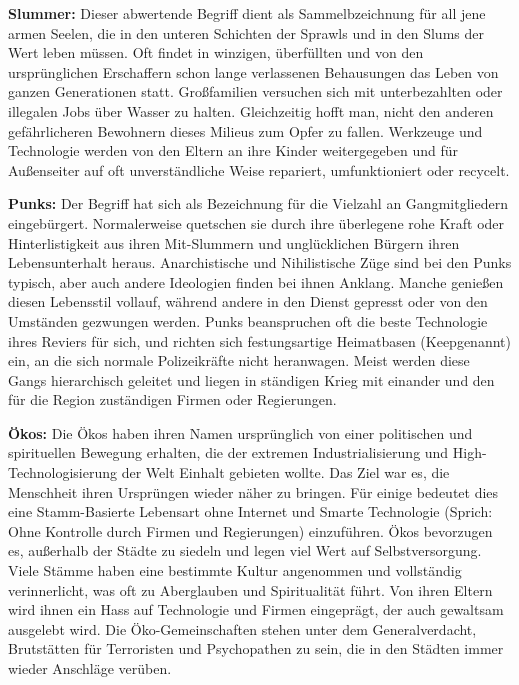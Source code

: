 \textbf{Slummer:} Dieser abwertende Begriff dient als Sammelbzeichnung für all jene armen Seelen, die in den unteren Schichten der Sprawls und in den Slums der Wert leben müssen. Oft findet in winzigen, überfüllten und von den ursprünglichen Erschaffern schon lange verlassenen Behausungen das Leben von ganzen Generationen statt. Großfamilien versuchen sich mit unterbezahlten oder illegalen Jobs über Wasser zu halten. Gleichzeitig hofft man, nicht den anderen gefährlicheren Bewohnern dieses Milieus zum Opfer zu fallen. Werkzeuge und Technologie werden von den Eltern an ihre Kinder weitergegeben und für Außenseiter auf oft unverständliche Weise repariert, umfunktioniert oder recycelt.

\textbf{Punks:} Der Begriff hat sich als Bezeichnung für die Vielzahl an Gangmitgliedern eingebürgert. Normalerweise quetschen sie durch ihre überlegene rohe Kraft oder Hinterlistigkeit aus ihren Mit-Slummern und unglücklichen Bürgern ihren Lebensunterhalt heraus. Anarchistische und Nihilistische Züge sind bei den Punks typisch, aber auch andere Ideologien finden bei ihnen Anklang. Manche genießen diesen Lebensstil vollauf, während andere in den \glqq Dienst\grqq{} gepresst oder von den Umständen gezwungen werden. Punks beanspruchen oft die beste Technologie ihres Reviers für sich, und richten sich festungsartige Heimatbasen (\glqq Keep\grqq genannt) ein, an die sich normale Polizeikräfte nicht heranwagen. Meist werden diese Gangs hierarchisch geleitet und liegen in ständigen Krieg mit einander und den für die Region zuständigen Firmen oder Regierungen.

\textbf{Ökos:} Die Ökos haben ihren Namen ursprünglich von einer politischen und spirituellen Bewegung erhalten, die der extremen Industrialisierung und High-Technologisierung der Welt Einhalt gebieten wollte. Das Ziel war es, die Menschheit ihren Ursprüngen wieder näher zu bringen. Für einige bedeutet dies eine Stamm-Basierte Lebensart ohne Internet und Smarte Technologie (Sprich: Ohne Kontrolle durch Firmen und Regierungen) einzuführen. Ökos bevorzugen es, außerhalb der Städte zu siedeln und legen viel Wert auf Selbstversorgung. Viele Stämme haben eine bestimmte Kultur angenommen und vollständig verinnerlicht, was oft zu Aberglauben und Spiritualität führt. Von ihren Eltern wird ihnen ein Hass auf Technologie und Firmen eingeprägt, der auch gewaltsam ausgelebt wird. Die Öko-Gemeinschaften stehen unter dem Generalverdacht, Brutstätten für Terroristen und Psychopathen zu sein, die in den Städten immer wieder Anschläge verüben.
